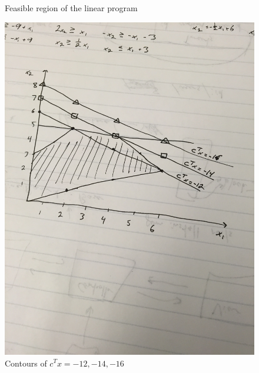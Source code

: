 \documentclass[12pt]{article}
\begin{document}
\begin{enumerate}
\begin{figure}
    \caption{Feasible region of the linear program}
  \end{figure}
  \begin{figure}
    \includegraphics[width=\linewidth,angle=-90]{contours.jpg}
    \caption{Contours of $c^Tx = {-12, -14, -16}$}
  \end{figure}
  \begin{figure}

\end{figure}
\end{enumerate}
\end{document}
